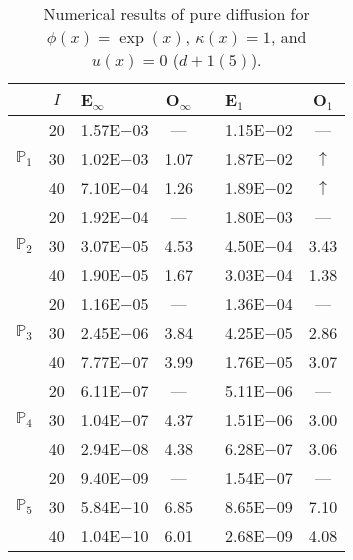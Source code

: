 \begin{table}[H]
\centering
\caption{Numerical results of pure diffusion for $\phi(x)=\exp(x)$, $\kappa(x)=1$, and $u(x)=0$ ($d+1(5)$).}
\begin{tabular}{@{}l c l c c l c@{}}
\toprule
 & $I$ & E$_{\infty}$ & O$_{\infty}$ && E$_1$ & O$_1$\\
\midrule
\multirow{3}{*}{$\mathbb{P}_{1}$}
 & 20 & 1.57E$-$03 & --- && 1.15E$-$02 & ---\\
 & 30 & 1.02E$-$03 & 1.07 && 1.87E$-$02 & $\uparrow$\\
 & 40 & 7.10E$-$04 & 1.26 && 1.89E$-$02 & $\uparrow$\\
\midrule
\multirow{3}{*}{$\mathbb{P}_{2}$}
 & 20 & 1.92E$-$04 & --- && 1.80E$-$03 & ---\\
 & 30 & 3.07E$-$05 & 4.53 && 4.50E$-$04 & 3.43\\
 & 40 & 1.90E$-$05 & 1.67 && 3.03E$-$04 & 1.38\\
\midrule
\multirow{3}{*}{$\mathbb{P}_{3}$}
 & 20 & 1.16E$-$05 & --- && 1.36E$-$04 & ---\\
 & 30 & 2.45E$-$06 & 3.84 && 4.25E$-$05 & 2.86\\
 & 40 & 7.77E$-$07 & 3.99 && 1.76E$-$05 & 3.07\\
\midrule
\multirow{3}{*}{$\mathbb{P}_{4}$}
 & 20 & 6.11E$-$07 & --- && 5.11E$-$06 & ---\\
 & 30 & 1.04E$-$07 & 4.37 && 1.51E$-$06 & 3.00\\
 & 40 & 2.94E$-$08 & 4.38 && 6.28E$-$07 & 3.06\\
\midrule
\multirow{3}{*}{$\mathbb{P}_{5}$}
 & 20 & 9.40E$-$09 & --- && 1.54E$-$07 & ---\\
 & 30 & 5.84E$-$10 & 6.85 && 8.65E$-$09 & 7.10\\
 & 40 & 1.04E$-$10 & 6.01 && 2.68E$-$09 & 4.08\\
\bottomrule
\end{tabular}
\end{table}
